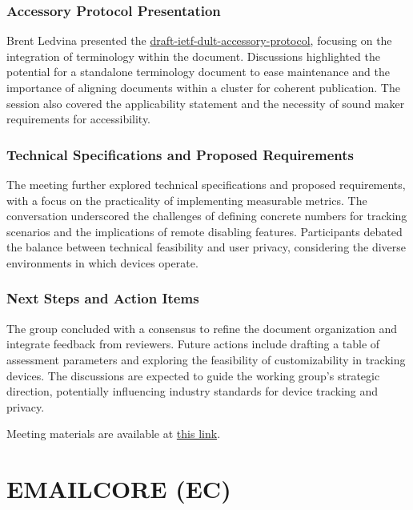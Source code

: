 \documentclass{article}
\begin{document}
\subsubsection{Accessory Protocol Presentation}

Brent Ledvina presented the \href{https://datatracker.ietf.org/doc/html/draft-ietf-dult-accessory-protocol}{draft-ietf-dult-accessory-protocol}, focusing on the integration of terminology within the document. Discussions highlighted the potential for a standalone terminology document to ease maintenance and the importance of aligning documents within a cluster for coherent publication. The session also covered the applicability statement and the necessity of sound maker requirements for accessibility.

\subsubsection{Technical Specifications and Proposed Requirements}

The meeting further explored technical specifications and proposed requirements, with a focus on the practicality of implementing measurable metrics. The conversation underscored the challenges of defining concrete numbers for tracking scenarios and the implications of remote disabling features. Participants debated the balance between technical feasibility and user privacy, considering the diverse environments in which devices operate.

\subsubsection{Next Steps and Action Items}

The group concluded with a consensus to refine the document organization and integrate feedback from reviewers. Future actions include drafting a table of assessment parameters and exploring the feasibility of customizability in tracking devices. The discussions are expected to guide the working group's strategic direction, potentially influencing industry standards for device tracking and privacy.

Meeting materials are available at \href{https://datatracker.ietf.org/meeting/121/materials/slides-121-dult-dult-wg-accessory-protocol-slides-00}{this link}.



\newpage

\section{EMAILCORE (EC)}
\end{document}

